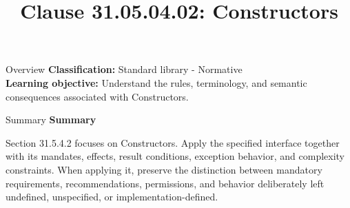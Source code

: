\documentclass[10pt,letterpaper]{article}
\title{Clause 31.05.04.02: Constructors}
\author{}
\date{}
\begin{document}
\maketitle
\begin{CornellOverviewBox}{Overview}
\textbf{Classification:} Standard library - Normative\\[2pt]
\textbf{Learning objective:} Understand the rules, terminology, and semantic consequences associated with Constructors.
\end{CornellOverviewBox}\begin{CornellSummaryBox}{Summary}
{\sffamily\bfseries\color{Accent} Summary}\par\vspace{3pt}Section 31.5.4.2 focuses on Constructors. Apply the specified interface together with its mandates, effects, result conditions, exception behavior, and complexity constraints. When applying it, preserve the distinction between mandatory requirements, recommendations, permissions, and behavior deliberately left undefined, unspecified, or implementation-defined.
\end{CornellSummaryBox}
\end{document}
